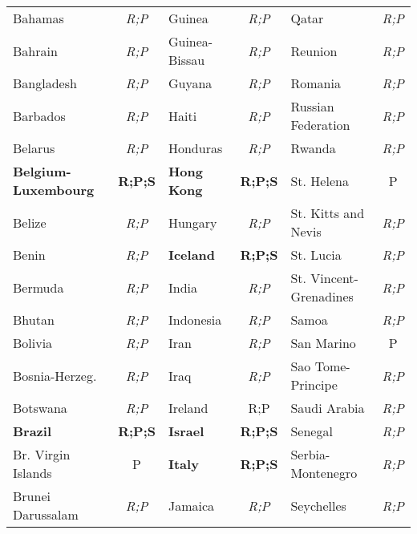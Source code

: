 \documentclass[12pt,twoside,a4paper,notitlepage]{article}
\begin{document}
{\begin{table}
\begin{tabular}{|l|c|l|c|l|c|}
   Bahamas &  {\it R;P} &     Guinea &  {\it R;P} &      Qatar &  {\it R;P} \\

   Bahrain &  {\it R;P} & Guinea-Bissau &  {\it R;P} &    Reunion &  {\it R;P} \\

Bangladesh &  {\it R;P} &     Guyana &  {\it R;P} &    Romania &  {\it R;P} \\

  Barbados &  {\it R;P} &      Haiti &  {\it R;P} & Russian Federation &  {\it R;P} \\

   Belarus &  {\it R;P} &   Honduras &  {\it R;P} &     Rwanda &  {\it R;P} \\

  \bf Belgium-Luxembourg &  {\bf R;P;S} & \bf Hong Kong &  {\bf R;P;S} & St.
Helena &          P \\

    Belize &  {\it R;P} &    Hungary &  {\it R;P} & St.
Kitts and Nevis &  {\it R;P} \\

     Benin &  {\it R;P} &  \bf Iceland &  {\bf R;P;S} &  St.
Lucia &  {\it R;P} \\

   Bermuda &  {\it R;P} &      India &  {\it R;P} & St.
Vincent-Grenadines &  {\it R;P} \\

    Bhutan &  {\it R;P} &  Indonesia &  {\it R;P} &      Samoa &  {\it R;P} \\

   Bolivia &  {\it R;P} &       Iran &  {\it R;P} & San Marino &          P \\

Bosnia-Herzeg.
&  {\it R;P} &       Iraq &  {\it R;P} & Sao Tome-Principe &  {\it R;P} \\

  Botswana &  {\it R;P} &   Ireland &  {R;P} & Saudi Arabia &  {\it R;P} \\

  \bf Brazil &  {\bf R;P;S} &  \bf Israel &  {\bf R;P;S} &    Senegal &  {\it R;P} \\

Br.
Virgin Islands &          P &   \bf Italy &  {\bf R;P;S} & Serbia-Montenegro &  {\it R;P} \\

Brunei Darussalam &  {\it R;P} &    Jamaica &  {\it R;P} & Seychelles &  {\it R;P} \\


\end{tabular}
\end{table}}
\end{document}
